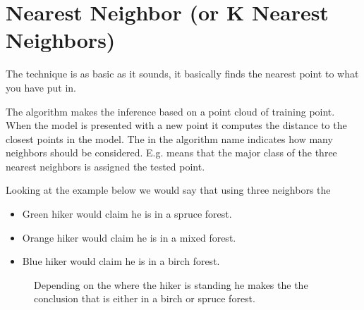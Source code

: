 \documentclass[letterpaper,10pt,english]{sphinxmanual}
\begin{document}
\noindent{}


\section{Nearest Neighbor (or K Nearest Neighbors)}
\label{\detokenize{05-SupervisedSegmentation:nearest-neighbor-or-k-nearest-neighbors}}
\sphinxAtStartPar
The technique is as basic as it sounds, it basically finds the nearest point to what you have put in.

\sphinxAtStartPar
The  algorithm makes the inference based on a point cloud of training point. When the model is presented with a new point it computes the distance to the closest points in the model. The  in the algorithm name indicates how many neighbors should be considered. E.g.  means that the major class of the three nearest neighbors is assigned the tested point.

\sphinxAtStartPar
Looking at the example below we would say that using three neighbors the
\begin{itemize}
\item {} 
\sphinxAtStartPar
Green hiker would claim he is in a spruce forest.

\item {} 
\sphinxAtStartPar
Orange hiker would claim he is in a mixed forest.

\item {} 
\sphinxAtStartPar
Blue hiker would claim he is in a birch forest.

\end{itemize}

\begin{figure}[htbp]
\centering
\capstart

\noindent{}
\caption{Depending on the where the hiker is standing he makes the the conclusion that is either in a birch or spruce forest.}\label{\detokenize{05-SupervisedSegmentation:id1}}\end{figure}
\end{document}
